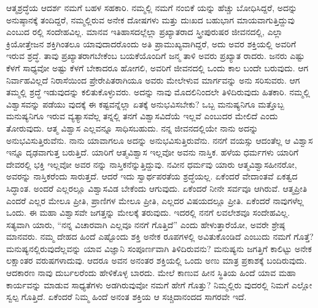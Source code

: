 ಆತ್ಮಶ್ರದ್ಧೆಯ ಆದರ್ಶ ನಮಗೆ ಬಹಳ ಸಹಕಾರಿ. ನಮ್ಮಲ್ಲಿ ನಮಗೆ ನಂಬಿಕೆ ಯನ್ನು ಹೆಚ್ಚು ಬೋಧಿಸಿದ್ದರೆ, ಅದನ್ನು ಅನುಷ್ಠಾನಕ್ಕೆ ತಂದಿದ್ದರೆ, ನಮ್ಮಲ್ಲಿರುವ ಅನೇಕ ದೋಷಗಳು ಮತ್ತು ದುಃಖದ ಬಹುಭಾಗ ಮಾಯವಾಗುತ್ತಿದ್ದುವು ಎಂಬುದ ರಲ್ಲಿ ಸಂದೇಹವಿಲ್ಲ. ಮಾನವ ಇತಿಹಾಸದಲ್ಲೆಲ್ಲಾ ಪ್ರಖ್ಯಾತರಾದ ಸ್ತ್ರೀಪುರುಷರ ಜೀವನದಲ್ಲಿ, ಎಲ್ಲಾ ಕ್ರಿಯೋತ್ತೇಜನ ಶಕ್ತಿಗಿಂತಲೂ ಯಾವುದಾದರೊಂದು ಅತಿ ಪ್ರಾಮುಖ್ಯವಾಗಿದ್ದರೆ, ಅದು ಅವರ ಶಕ್ತಿಯಲ್ಲಿ ಅವರಿಗೆ ಇರುವ ಶ್ರದ್ಧೆ. ತಾವು ಪ್ರಖ್ಯಾತರಾಗಬೇಕೆಂಬ ಬಯಕೆಯೊಂದಿಗೆ ಜನ್ಮ ತಾಳಿ ಅವರು ಪ್ರಖ್ಯಾತ ರಾದರು. ಜನರು ಎಷ್ಟು ಕೆಳಗೆ ಸಾಧ್ಯವೋ ಅಷ್ಟು ಕೆಳಗೆ ಬೇಕಾದರೂ ಹೋಗಲಿ, ಅವರಿಗೆ ಜೀವನದಲ್ಲಿ ಒಂದು ಕಾಲ ಬಂದೇ ಬರುವುದು. ಆಗ ನಿರ್ವಾಹವಿಲ್ಲದೆ ನಿರಾಸೆಯಿಂದ ಪ್ರೇರೇಪಿತರಾಗಿಯೂ ಅವರು ಮೇಲೇಳುವ ಮಾರ್ಗವನ್ನು ಅನು ಸರಿಸುವರು. ಆಗ ತಮ್ಮಲ್ಲಿ ಶ್ರದ್ಧೆ ಇಡುವುದನ್ನು ಕಲಿತುಕೊಳ್ಳುವರು. ಅದನ್ನು ನಾವು ಮೊದಲಿನಿಂದಲೇ ತಿಳಿದಿರುವುದು ಹಿತಕಾರಿ. ನಮ್ಮಲ್ಲಿ ವಿಶ್ವಾಸವನ್ನು ಪಡೆಯು ವುದಕ್ಕೆ ಈ ಕಷ್ಟವನ್ನೆಲ್ಲಾ ಏತಕ್ಕೆ ಅನುಭವಿಸಬೇಕು? ಒಬ್ಬ ಮನುಷ್ಯನಿಗೂ ಮತ್ತೊಬ್ಬ ಮನುಷ್ಯನಿಗೂ ಇರುವ ವ್ಯತ್ಯಾಸವೆಲ್ಲ ತನ್ನಲ್ಲಿ ತನಗೆ ವಿಶ್ವಾಸವಿದೆಯೆ ಇಲ್ಲವೆ ಎಂಬುದರ ಮೇಲಿದೆ ಎಂದು ತೋರುವುದು. ಆತ್ಮ ವಿಶ್ವಾಸ ಎಲ್ಲವನ್ನೂ ಸಾಧಿಸಬಹುದು. ನನ್ನ ಜೀವನದಲ್ಲಿಯೇ ನಾನು ಅದನ್ನು ಅನುಭವಿಸುತ್ತಿರುವೆನು. ನಾನು ಯಾವಾಗಲೂ ಅದನ್ನು ಅನುಭವಿಸುತ್ತಿರುವೆನು. ನನಗೆ ವಯಸ್ಸು ಆದಂತೆಲ್ಲ ಆ ವಿಶ್ವಾಸ ಇನ್ನೂ ದೃಢವಾಗುತ್ತ ಬರುತ್ತಿದೆ. ಯಾರಿಗೆ ಆತ್ಮವಿಶ್ವಾಸ ಇಲ್ಲವೋ ಅವನು ನಾಸ್ತಿಕ. ಹಳೆಯ ಧರ್ಮಗಳು ಯಾರಿಗೆ ದೇವರಲ್ಲಿ ಭಕ್ತಿ ಇಲ್ಲವೋ ಅವರ ನನ್ನು ನಾಸ್ತಿಕನೆನ್ನುತ್ತಿದ್ದುವು. ನವೀನ ಧರ್ಮವು ಯಾರು ಆತ್ಮವಿಶ್ವಾಸಹೀನರೋ, ಅವರನ್ನು ನಾಸ್ತಿಕರೆಂದು ಸಾರುತ್ತದೆ. ಆದರೆ ಇದು ಸ್ವಾರ್ಥಪರತೆಯ ಶ್ರದ್ಧೆಯಲ್ಲ. ಏಕೆಂದರೆ ವೇದಾಂತವೆ ಏಕತ್ವದ ಸಿದ್ಧಾಂತ. ಅಂದರೆ ಎಲ್ಲರಲ್ಲೂ ವಿಶ್ವಾಸವಿಡ ಬೇಕೆಂದು ಆಗುವುದು. ಏಕೆಂದರೆ ನೀನೇ ಸರ್ವವೂ ಆಗಿರುವೆ. ಆತ್ಮಪ್ರೀತಿ ಎಂದರೆ ಎಲ್ಲರ ಮೇಲೂ ಪ್ರೀತಿ, ಪ್ರಾಣಿಗಳ ಮೇಲೂ ಪ್ರೀತಿ, ಎಲ್ಲದರ ವಿಷಯದಲ್ಲೂ ಪ್ರೀತಿ. ಏಕೆಂದರೆ ನಾವುಗಳೆಲ್ಲ ಒಂದು. ಈ ಮಹಾ ವಿಶ್ವಾಸವೇ ಜಗತ್ತನ್ನು ಮೇಲಕ್ಕೆ ತರುವುದು. ಇದರಲ್ಲಿ ನನಗೆ ಲವಲೇಶವೂ ಸಂದೇಹವಿಲ್ಲ. ಸತ್ಯವಾಗಿ ಯಾರು, “ನನ್ನ ವಿಚಾರವಾಗಿ ಎಲ್ಲವೂ ನನಗೆ ಗೊತ್ತಿದೆ” ಎಂದು ಹೇಳುತ್ತಾರೆಯೋ, ಅವರೇ ಶ್ರೇಷ್ಠ ಮಾನವರು. ನಮ್ಮ ದೇಹದ ಹಿಂದೆ ಎಷ್ಟೊಂದು ಶಕ್ತಿ ಅನೇಕ ರೂಪಗಳಲ್ಲಿ ಅವಿತುಕೊಂಡಿದೆ ಎಂಬುದು ನಮಗೆ ಗೊತ್ತೆ? ಮನುಷ್ಯನಲ್ಲಿರುವುದೆಲ್ಲವನ್ನು ಯಾವ ವಿಜ್ಞಾನಿ ಸಂಪೂರ್ಣವಾಗಿ ತಿಳಿದಿರುವನು? ಮನುಷ್ಯನು ಜಗತ್ತಿಗೆ ಕಾಲಿಟ್ಟು ಅನೇಕ ಲಕ್ಷಾಂತರ ವರುಷಗಳಾದುವು. ಆದರೂ ಅವನ ಅನಂತರ ಶಕ್ತಿಯಲ್ಲಿ ಒಂದು ಅಣು ಮಾತ್ರ ಪ್ರಕಾಶಕ್ಕೆ ಬಂದಿರುವುದು. ಆದಕಾರಣ ನಾವು ದುರ್ಬಲರೆಂದು ಹೇಳಿಕೊಳ್ಳ ಬಾರದು. ಮೇಲೆ ಕಾಣುವ ಹೀನ ಸ್ಥಿತಿಯ ಹಿಂದೆ ಯಾವ ಮಹಾ ಕಾರ್ಯವನ್ನು ಮಾಡುವ ಸಾಧ್ಯತೆಗಳು ಅಡಗಿರುವುವೋ ನಮಗೆ ಹೇಗೆ ಗೊತ್ತು? ನಿಮ್ಮಲ್ಲಿರು ವುದರಲ್ಲಿ ನಿಮಗೆ ಎಲ್ಲೋ ಸ್ವಲ್ಪ ಗೊತ್ತಿದೆ. ಏಕೆಂದರೆ ನಿಮ್ಮ ಹಿಂದೆ ಅನಂತ ಶಕ್ತಿಯ ಆ ಸಚ್ಚಿದಾನಂದದ ಸಾಗರವೇ ಇದೆ.

